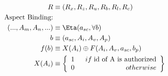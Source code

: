\begin{align*}
R & \equiv (R_x, R_z, R_u, R_b, R_l, R_c) \\
\text{Aspect Binding:} & \\
(...,A_m, A_n,...) & \equiv \Eta(a_{sc}, \forall b)\\ 
b & \equiv (a_{sc},A_i, A_v, A_p) \\
f(b) & \equiv X(A_i) \oplus F(A_i, A_v,a_{sc},b_p) \\
X(A_i) & \equiv
\left\{\begin{array}{l}1\;\\0\end{array}\left.\begin{array}{r}if\;\text{id of A is authorized}\\otherwise\end{array}\right\}\right.\\
\end{align*}
